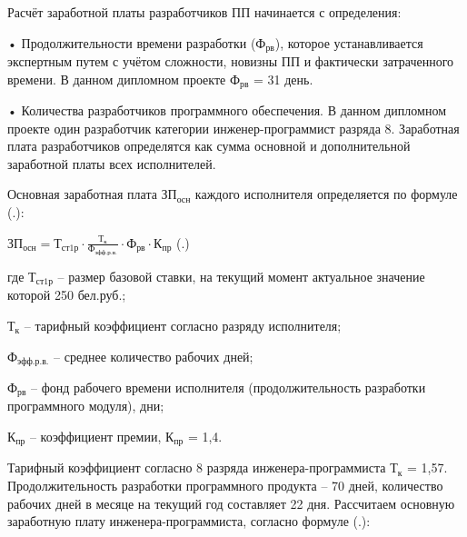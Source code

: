 {	\par \redline Расчёт заработной платы разработчиков ПП начинается с определения:
	\par \redline •	Продолжительности времени разработки ($\textrm{Ф}_{\textrm{рв}}$), которое устанавливается экспертным путем с учётом сложности, новизны ПП и фактически затраченного времени. В данном дипломном проекте $\textrm{Ф}_{\textrm{рв}}$ = 31 день.
	\par \redline •	Количества разработчиков программного обеспечения. В данном дипломном проекте один разработчик категории инженер-программист разряда 8. Заработная плата разработчиков определятся как сумма основной и дополнительной заработной платы всех исполнителей.

	\par \redline Основная заработная плата $\textrm{ЗП}_{\textrm{осн}}$ каждого исполнителя определяется по формуле (\thechaptercntr .\theformulacntr):

	\formulaspace \par \redline 
	$\textrm{ЗП}_{\textrm{осн}} = \textrm{Т}_{\textrm{ст1р}} \cdot \frac{\textrm{Т}_{\textrm{к}}}{\textrm{Ф}_{\textrm{эфф.р.в.}}} \cdot \textrm{Ф}_{\textrm{рв}} \cdot \textrm{К}_{\textrm{пр}}$ 
	\hfill (\thechaptercntr .\theformulacntr) \redline
	\formulaspace 
	
	\par \redline где $\textrm{Т}_{\textrm{ст1р}}$ {--} размер базовой ставки, на текущий момент актуальное значение которой 250 бел.руб.;
	\par \redline \wherespace $\textrm{Т}_{\textrm{к}}$ {--} тарифный коэффициент согласно разряду исполнителя;
	\par \redline \wherespace $\textrm{Ф}_{\textrm{эфф.р.в.}}$ {--} среднее количество рабочих дней;
	\par \redline \wherespace $\textrm{Ф}_{\textrm{рв}}$ {--} фонд рабочего времени исполнителя (продолжительность разработки программного модуля), дни;
	\par \redline \wherespace $\textrm{К}_{\textrm{пр}}$ {--} коэффициент премии, $\textrm{К}_{\textrm{пр}}$ = 1,4.

	\par \redline Тарифный коэффициент согласно 8 разряда инженера-программиста $\textrm{Т}_{\textrm{к}}$ = 1,57. Продолжительность разработки программного продукта – 70 дней, количество рабочих дней в месяце на текущий год составляет 22 дня. Рассчитаем основную заработную плату инженера-программиста, согласно формуле (\thechaptercntr .\theformulacntr): \addtocounter{formulacntr}{1}
	
}
